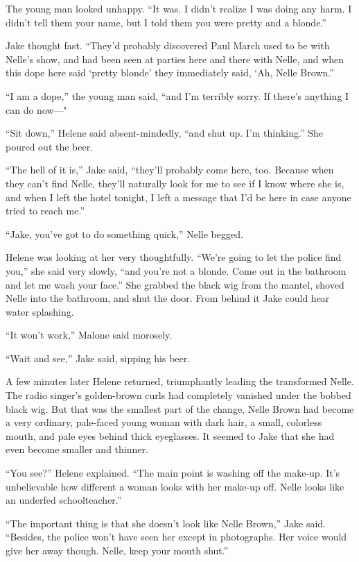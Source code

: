 \documentclass{novel}
\begin{document}
The young man looked unhappy. “It was. I didn’t realize I was doing any harm. I didn’t tell them your name, but I told them you were pretty and a blonde.”

Jake thought fast. “They’d probably discovered Paul March used to be with Nelle’s show, and had been seen at parties here and there with Nelle, and when this dope here said ‘pretty blonde’ they immediately said, ‘Ah, Nelle Brown.”

“I am a dope,” the young man said, “and I’m terribly sorry. If there’s anything I can do now—"

“Sit down,” Helene said absent-mindedly, “and shut up. I’m thinking.” She poured out the beer.

“The hell of it is,” Jake said, “they’ll probably come here, too. Because when they can’t find Nelle, they’ll naturally look for me to see if I know where she is, and when I left the hotel tonight, I left a message that I’d be here in case anyone tried to reach me.”

“Jake, you’ve got to do something quick,” Nelle begged.

Helene was looking at her very thoughtfully. “We’re going to let the police find you,” she said very slowly, “and you’re not a blonde. Come out in the bathroom and let me wash your face.” She grabbed the black wig from the mantel, shoved Nelle into the bathroom, and shut the door. From behind it Jake could hear water splashing.

“It won’t work,” Malone said morosely.

“Wait and see,” Jake said, sipping his beer.

A few minutes later Helene returned, triumphantly leading the transformed Nelle. The radio singer’s golden-brown curls had completely vanished under the bobbed black wig. But that was the smallest part of the change, Nelle Brown had become a very ordinary, pale-faced young woman with dark hair, a small, colorless mouth, and pale eyes behind thick eyeglasses. It seemed to Jake that she had even become smaller and thinner.

“You see?” Helene explained. “The main point is washing off the make-up. It’s unbelievable how different a woman looks with her make-up off. Nelle looks like an underfed schoolteacher.”

“The important thing is that she doesn’t look like Nelle Brown,” Jake said. “Besides, the police won’t have seen her except in photographs. Her voice would give her away though. Nelle, keep your mouth shut.”
\end{document}
